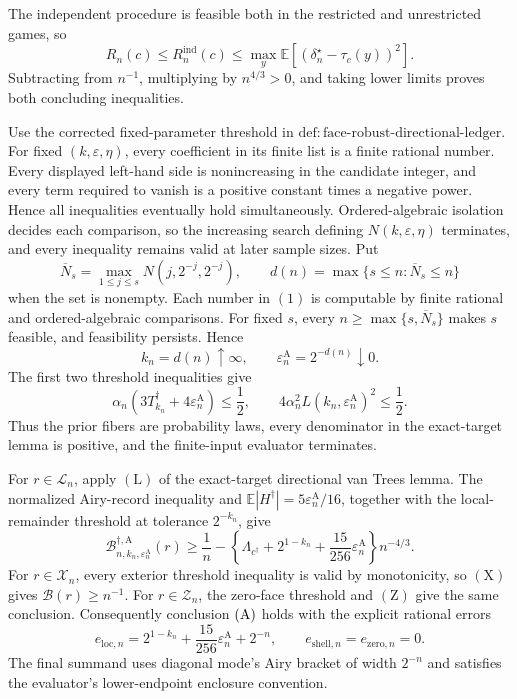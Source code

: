 The independent procedure is feasible both in the restricted and unrestricted games, so
\[
R_n(c)\le R_n^{\mathrm{ind}}(c)
\le\max_y\mathbb E[(\delta_n^\star-\tau_c(y))^2].
\]
Subtracting from \(n^{-1}\), multiplying by \(n^{4/3}>0\), and taking lower limits proves both concluding inequalities.

Use the corrected fixed-parameter threshold in
\(\mathrm{def:face\text{-}robust\text{-}directional\text{-}ledger}\).  For fixed
\((k,\varepsilon,\eta)\), every coefficient in its finite list is a finite rational number.  Every displayed left-hand side is nonincreasing in the candidate integer, and every term required to vanish is a positive constant times a negative power.  Hence all inequalities eventually hold simultaneously.  Ordered-algebraic isolation decides each comparison, so the increasing search defining \(N(k,\varepsilon,\eta)\) terminates, and every inequality remains valid at later sample sizes.  Put
\[
\overline N_s=\max_{1\le j\le s}N(j,2^{-j},2^{-j}),
\qquad
d(n)=\max\{s\le n:\overline N_s\le n\}
\tag{1}
\]
when the set is nonempty.  Each number in \((1)\) is computable by finite rational and ordered-algebraic comparisons.  For fixed \(s\), every
\(n\ge\max\{s,\overline N_s\}\) makes \(s\) feasible, and feasibility persists.  Hence
\[
k_n=d(n)\uparrow\infty,\qquad
\varepsilon_n^{\mathrm A}=2^{-d(n)}\downarrow0.
\tag{2}
\]
The first two threshold inequalities give
\[
\alpha_n(3T_{k_n}^\dagger+4\varepsilon_n^{\mathrm A})\le\frac12,
\qquad
4\alpha_n^2L(k_n,\varepsilon_n^{\mathrm A})^2\le\frac12.
\tag{3}
\]
Thus the prior fibers are probability laws, every denominator in the exact-target lemma is positive, and the finite-input evaluator terminates.

For \(r\in\mathcal L_n\), apply \((\mathrm L)\) of the exact-target directional van Trees lemma.  The normalized Airy-record inequality and
\(\mathbb E|H^\dagger|=5\varepsilon_n^{\mathrm A}/16\), together with the local-remainder threshold at tolerance \(2^{-k_n}\), give
\[
\mathcal B_{n,k_n,\varepsilon_n^{\mathrm A}}^{\dagger,\mathrm A}(r)
\ge\frac1n-
\left\{\Lambda_{c^\dagger}+2^{1-k_n}
+\frac{15}{256}\varepsilon_n^{\mathrm A}\right\}n^{-4/3}.
\tag{4}
\]
For \(r\in\mathcal X_n\), every exterior threshold inequality is valid by monotonicity, so \((\mathrm X)\) gives
\(\mathcal B(r)\ge n^{-1}\).  For \(r\in\mathcal Z_n\), the zero-face threshold and \((\mathrm Z)\) give the same conclusion.  Consequently conclusion \({\rm(A)}\) holds with the explicit rational errors
\[
e_{\mathrm{loc},n}=2^{1-k_n}+\frac{15}{256}\varepsilon_n^{\mathrm A}+2^{-n},
\qquad e_{\mathrm{shell},n}=e_{\mathrm{zero},n}=0.
\tag{5}
\]
The final summand uses diagonal mode's Airy bracket of width \(2^{-n}\) and satisfies the evaluator's lower-endpoint enclosure convention.

